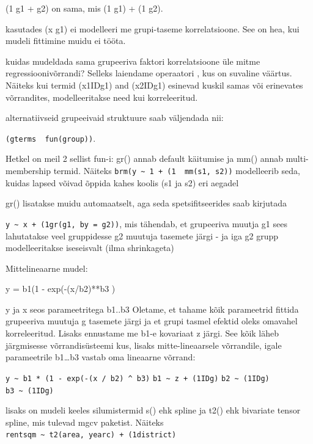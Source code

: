 \documentclass[]{book}
\begin{document}
(1 \textbar{} g1 + g2) on sama, mis (1 \textbar{} g1) + (1 \textbar{} g2).

\textbar{}\textbar{} kasutades (x \textbar{}\textbar{} g1) ei modelleeri me grupi-taseme korrelatsioone. See on hea, kui mudeli fittimine muidu ei tööta.

kuidas mudeldada sama grupeeriva faktori korrelatsioone üle mitme regressioonivõrrandi? Selleks laiendame \textbar{} operaatori \textbar{}\textbar{}, kus on suvaline väärtus.
Näiteks kui termid (x1\textbar{}ID\textbar{}g1) and (x2\textbar{}ID\textbar{}g1) esinevad kuskil samas või erinevates võrrandites, modelleeritakse need kui korreleeritud.

alternatiivseid grupeeivaid struktuure saab väljendada nii:

\texttt{(gterms\ \textbar{}\ fun(group))}.

Hetkel on meil 2 sellist fun-i: gr() annab default käitumise ja mm() annab multi-membership termid.
Näiteks \texttt{brm(y\ \textasciitilde{}\ 1\ +\ (1\ \textbar{}\ mm(s1,\ s2))} modelleerib seda, kuidas lapsed võivad õppida kahes koolis (s1 ja s2) eri aegadel

gr() lisatakse muidu automaatselt, aga seda spetsifitseerides saab kirjutada

\texttt{y\ \textasciitilde{}\ x\ +\ (1\textbar{}gr(g1,\ by\ =\ g2))}, mis tähendab, et grupeeriva muutja g1 sees lahutatakse veel gruppidesse g2 muutuja tasemete järgi - ja iga g2 grupp modelleeritakse iseseisvalt (ilma shrinkageta)

Mittelineaarne mudel:

y = b1(1 - exp(-(x/b2)**b3 )

y ja x seos parameetritega b1..b3
Oletame, et tahame kõik parameetrid fittida grupeeriva muutuja g tasemete järgi ja et grupi tasmel efektid oleks omavahel korreleeritud. Lisaks ennustame me b1-e kovariaat z järgi. See kõik läheb järgmisesse võrrandisüsteemi kus, lisaks mitte-lineaarsele võrrandile, igale parameetrile b1\ldots{}b3 vastab oma lineaarne võrrand:

\texttt{y\ \textasciitilde{}\ b1\ *\ (1\ -\ exp(-(x\ /\ b2)\ \^{}\ b3)}
\texttt{b1\ \textasciitilde{}\ z\ +\ (1\textbar{}ID\textbar{}g)}
\texttt{b2\ \textasciitilde{}\ (1\textbar{}ID\textbar{}g)}
\texttt{b3\ \textasciitilde{}\ (1\textbar{}ID\textbar{}g)}

lisaks on mudeli keeles silumistermid s() ehk spline ja t2() ehk bivariate tensor spline, mis tulevad mgcv paketist.
Näiteks \texttt{rentsqm\ \textasciitilde{}\ t2(area,\ yearc)\ +\ (1\textbar{}district)}
\end{document}
